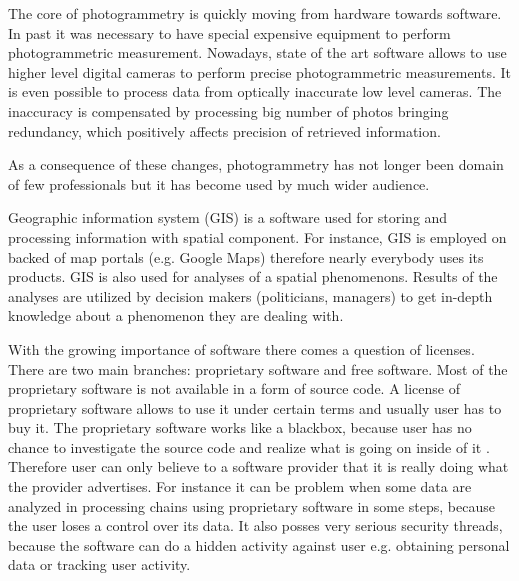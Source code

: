 \documentclass[a4paper,12pt]{article}
\begin{document}

The core of photogrammetry is quickly moving  from  hardware towards software. In past it was necessary to have special 
expensive equipment to perform photogrammetric measurement. Nowadays,
 state of the art software allows to use higher level digital cameras to perform precise photogrammetric measurements. 
  It is even possible to process data from optically inaccurate low level cameras.
 The inaccuracy is compensated by processing big number of photos bringing redundancy, 
 which positively affects precision of retrieved information.
 
As a consequence of these changes, photogrammetry has not longer been domain of few professionals but it has 
become used by much wider audience. 


Geographic information system (GIS) is a software used for storing and processing information
with spatial component. For instance,  GIS is employed on backed of map portals (e.g. Google Maps) therefore nearly 
everybody uses its products. 
GIS is also used  for analyses of a spatial phenomenons.
Results of the analyses are utilized by decision makers (politicians, managers) 
to get in-depth knowledge about a 
phenomenon they are dealing with.



With the growing importance of software there comes a question of licenses. There are two 
main branches: proprietary software and free software. Most of the proprietary software is not available in 
a form of source code. A license of proprietary software allows to use it under certain terms and usually user 
has to buy it. The proprietary software works like a blackbox, because user has no chance to investigate the source 
code and realize what is going on inside of it \cite{rocchini2012let}. Therefore user can only believe to a software provider
that it is really doing what the provider advertises. 
For instance it can be problem when some data are analyzed in processing chains using proprietary software in some steps,
because the user loses a control over its data.
It also posses very serious security threads, because the software can do a hidden activity against user
e.g. obtaining personal data or tracking user activity.
\end{document}
